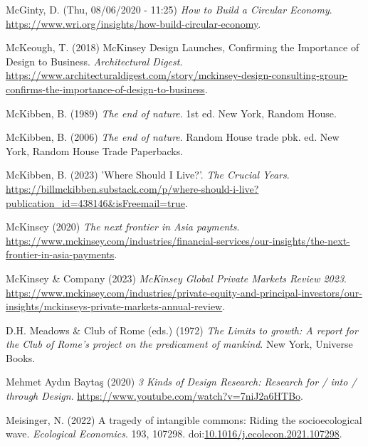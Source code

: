 \documentclass[
  letterpaper,
  DIV=11,
  numbers=noendperiod]{scrartcl}
\newlength{\cslhangindent}
\newenvironment{CSLReferences}[2] %
 {\begin{list}{}{%
  \setlength{\itemindent}{0pt}
  \setlength{\leftmargin}{0pt}
  \setlength{\parsep}{0pt}
  \ifodd #1
   \setlength{\leftmargin}{\cslhangindent}
   \setlength{\itemindent}{-1\cslhangindent}
  \fi
  \setlength{\itemsep}{#2\baselineskip}}}
 {\end{list}}
\begin{document}
\begin{CSLReferences}{0}{1}
McGinty, D. (Thu, 08/06/2020 - 11:25) \emph{How to {Build} a {Circular
Economy}}.
\url{https://www.wri.org/insights/how-build-circular-economy}.

McKeough, T. (2018) {McKinsey Design Launches}, {Confirming} the
{Importance} of {Design} to {Business}. \emph{Architectural Digest}.
\url{https://www.architecturaldigest.com/story/mckinsey-design-consulting-group-confirms-the-importance-of-design-to-business}.

McKibben, B. (1989) \emph{The end of nature}. 1st ed. New York, Random
House.

McKibben, B. (2006) \emph{The end of nature}. Random House trade pbk.
ed. New York, Random House Trade Paperbacks.

McKibben, B. (2023) '{Where Should I Live}?'. \emph{The Crucial Years}.
\url{https://billmckibben.substack.com/p/where-should-i-live?publication_id=438146&isFreemail=true}.

McKinsey (2020) \emph{The next frontier in {Asia} payments}.
\url{https://www.mckinsey.com/industries/financial-services/our-insights/the-next-frontier-in-asia-payments}.

McKinsey \& Company (2023) \emph{{McKinsey Global Private Markets
Review} 2023}.
\url{https://www.mckinsey.com/industries/private-equity-and-principal-investors/our-insights/mckinseys-private-markets-annual-review}.

D.H. Meadows \& Club of Rome (eds.) (1972) \emph{The {Limits} to growth:
A report for the {Club} of {Rome}'s project on the predicament of
mankind}. New York, Universe Books.

Mehmet Aydın Baytaş (2020) \emph{3 {Kinds} of {Design Research}:
{Research} for / into / through {Design}}.
\url{https://www.youtube.com/watch?v=7niJ2a6HTBo}.

Meisinger, N. (2022) A tragedy of intangible commons: {Riding} the
socioecological wave. \emph{Ecological Economics}. 193, 107298.
doi:\href{https://doi.org/10.1016/j.ecolecon.2021.107298}{10.1016/j.ecolecon.2021.107298}.


\end{CSLReferences}
\end{document}

